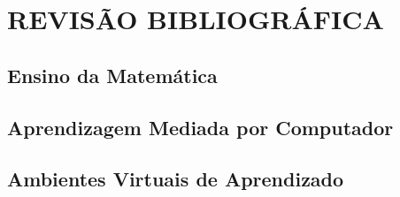 \chapter{REVIS\~AO BIBLIOGR\'AFICA}\label{chp:LABEL_CHP_3}

\section{Ensino da Matem\'atica}\label{sec:LABEL_CHP_3_SEC_A}

\section{Aprendizagem Mediada por Computador}\label{sec:LABEL_CHP_3_SEC_B}

\section{Ambientes Virtuais de Aprendizado}\label{sec:LABEL_CHP_3_SEC_C}
